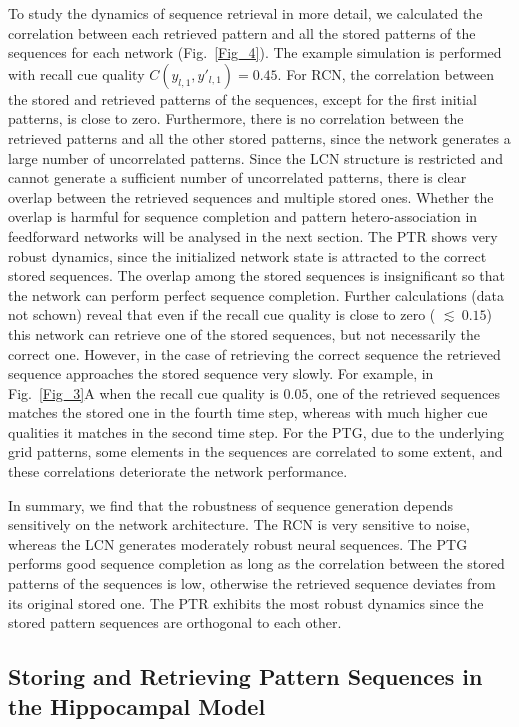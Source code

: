 \documentclass[utf8]{frontiersSCNS} %
\begin{document}
To study the dynamics of sequence retrieval in more detail, we calculated the correlation between each retrieved pattern and all the stored patterns of the sequences for each network (Fig.~\ref{Fig_4}). The example simulation is performed with recall cue quality $C(y_{l,1}, y'_{l,1}) = 0.45$. For RCN, the correlation between the stored and retrieved patterns of the sequences, except for the first initial patterns, is close to zero. Furthermore, there is no correlation between the retrieved patterns and all the other stored patterns, since the network generates a large number of uncorrelated patterns. Since the LCN structure is restricted and cannot generate a sufficient number of uncorrelated patterns, there is clear overlap between the retrieved sequences and multiple stored ones. Whether the overlap is harmful for sequence completion and pattern hetero-association in feedforward networks will be analysed in the next section. The PTR shows very robust dynamics, since the initialized network state is attracted to the correct stored sequences. The overlap among the stored sequences is insignificant so that the network can perform perfect sequence completion. 
%
Further calculations (data not schown) reveal that even if the recall cue quality is close to zero ( $\lesssim \: 0.15$) this network can retrieve one of the stored sequences, but not necessarily the correct one. However, in the case of retrieving the correct sequence the retrieved sequence approaches the stored sequence very slowly. For example, in Fig.~\ref{Fig_3}A when the recall cue quality is $0.05$, one of the retrieved sequences matches the stored one in the fourth time step, whereas with much higher cue qualities it matches in the second time step.    
%
For the PTG, due to the underlying grid patterns, some elements in the sequences are correlated to some extent, and these correlations deteriorate the network performance.

In summary, we find that the robustness of sequence generation depends sensitively on the network architecture. The RCN is very sensitive to noise, whereas the LCN generates moderately robust neural sequences. The PTG performs good sequence completion as long as the correlation between the stored patterns of the sequences is low, otherwise the retrieved sequence deviates from its original stored one. The PTR exhibits the most robust dynamics since the stored pattern sequences are orthogonal to each other.



\subsection{Storing and Retrieving Pattern Sequences in the Hippocampal Model}
\end{document}
